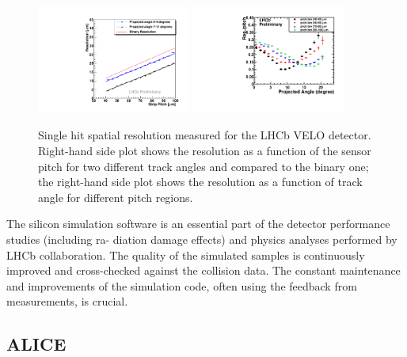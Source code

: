 \begin{figure}[]
    \centering
    \includegraphics[width=0.45\textwidth]{figures/SensorSimulation/reso.pdf}
    \includegraphics[width=0.45\textwidth]{figures/SensorSimulation/reso_projectedangle.pdf}
    \caption{
Single hit spatial resolution measured for the LHCb VELO detector. Right-hand side plot shows the
resolution as a function of the sensor pitch for two different track angles and compared to the binary one; the
right-hand side plot shows the resolution as a function of track angle for different pitch regions.
    }
    \label{fig:resolution}
\end{figure}

The silicon simulation software is an essential part of the detector performance studies (including ra-
diation damage effects) and physics analyses performed by LHCb collaboration. The quality of the
simulated samples is continuously improved and cross-checked against the collision data. The constant
maintenance and improvements of the simulation code, often using the feedback from measurements, is
crucial.


\subsection{ALICE}
\label{sec:ALICE}

